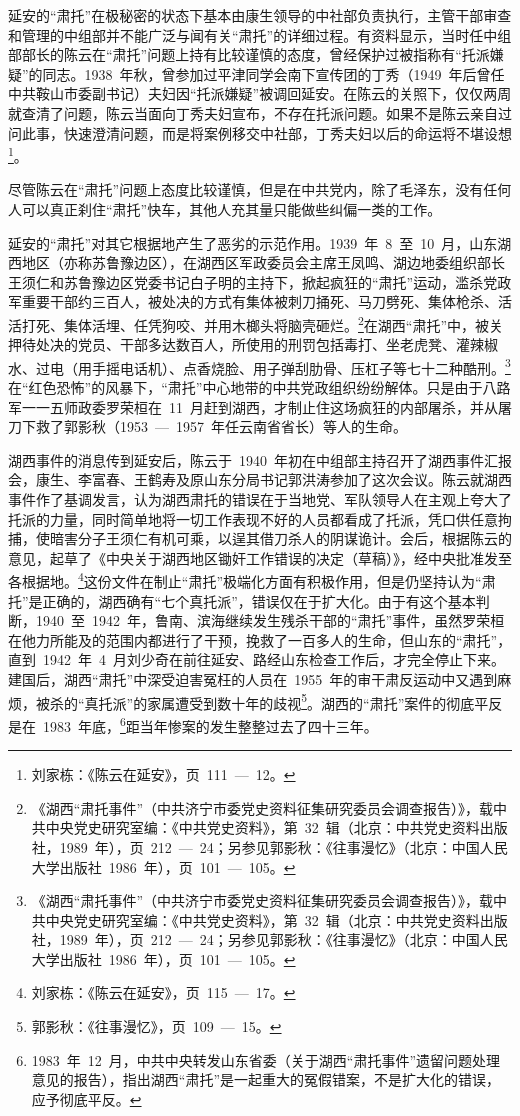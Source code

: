 延安的“肃托”在极秘密的状态下基本由康生领导的中社部负责执行，主管干部审查和管理的中组部并不能广泛与闻有关“肃托”的详细过程。有资料显示，当时任中组部部长的陈云在“肃托”问题上持有比较谨慎的态度，曾经保护过被指称有“托派嫌疑”的同志。1938~年秋，曾参加过平津同学会南下宣传团的丁秀（1949~年后曾任中共鞍山市委副书记）夫妇因“托派嫌疑”被调回延安。在陈云的关照下，仅仅两周就查清了问题，陈云当面向丁秀夫妇宣布，不存在托派问题。如果不是陈云亲自过问此事，快速澄清问题，而是将案例移交中社部，丁秀夫妇以后的命运将不堪设想\footnote{刘家栋：《陈云在延安》，页~111~—~12。}。

尽管陈云在“肃托”问题上态度比较谨慎，但是在中共党内，除了毛泽东，没有任何人可以真正刹住“肃托”快车，其他人充其量只能做些纠偏一类的工作。

延安的“肃托”对其它根据地产生了恶劣的示范作用。1939~年~8~至~10~月，山东湖西地区（亦称苏鲁豫边区），在湖西区军政委员会主席王凤鸣、湖边地委组织部长王须仁和苏鲁豫边区党委书记白子明的主持下，掀起疯狂的“肃托”运动，滥杀党政军重要干部约三百人，被处决的方式有集体被刺刀捅死、马刀劈死、集体枪杀、活活打死、集体活埋、任凭狗咬、并用木榔头将脑壳砸烂。\footnote{《湖西“肃托事件”（中共济宁市委党史资料征集研究委员会调查报告）》，载中共中央党史研究室编：《中共党史资料》，第~32~辑（北京：中共党史资料出版社，1989~年），页~212~—~24；另参见郭影秋：《往事漫忆》（北京：中国人民大学出版社~1986~年），页~101~—~105。}在湖西“肃托”中，被关押待处决的党员、干部多达数百人，所使用的刑罚包括毒打、坐老虎凳、灌辣椒水、过电（用手摇电话机）、点香烧脸、用子弹刮肋骨、压杠子等七十二种酷刑。\footnote{《湖西“肃托事件”（中共济宁市委党史资料征集研究委员会调查报告）》，载中共中央党史研究室编：《中共党史资料》，第~32~辑（北京：中共党史资料出版社，1989~年），页~212~—~24；另参见郭影秋：《往事漫忆》（北京：中国人民大学出版社~1986~年），页~101~—~105。}在“红色恐怖”的风暴下，“肃托”中心地带的中共党政组织纷纷解体。只是由于八路军一一五师政委罗荣桓在~11~月赶到湖西，才制止住这场疯狂的内部屠杀，并从屠刀下救了郭影秋（1953~—~1957~年任云南省省长）等人的生命。

湖西事件的消息传到延安后，陈云于~1940~年初在中组部主持召开了湖西事件汇报会，康生、李富春、王鹤寿及原山东分局书记郭洪涛参加了这次会议。陈云就湖西事件作了基调发言，认为湖西肃托的错误在于当地党、军队领导人在主观上夸大了托派的力量，同时简单地将一切工作表现不好的人员都看成了托派，凭口供任意拘捕，使暗害分子王须仁有机可乘，以逞其借刀杀人的阴谋诡计。会后，根据陈云的意见，起草了《中央关于湖西地区锄奸工作错误的决定（草稿）》，经中央批准发至各根据地。\footnote{刘家栋：《陈云在延安》，页~115~—~17。}这份文件在制止“肃托”极端化方面有积极作用，但是仍坚持认为“肃托”是正确的，湖西确有“七个真托派”，错误仅在于扩大化。由于有这个基本判断，1940~至~1942~年，鲁南、滨海继续发生残杀干部的“肃托”事件，虽然罗荣桓在他力所能及的范围内都进行了干预，挽救了一百多人的生命，但山东的“肃托”，直到~1942~年~4~月刘少奇在前往延安、路经山东检查工作后，才完全停止下来。建国后，湖西“肃托”中深受迫害冤枉的人员在~1955~年的审干肃反运动中又遇到麻烦，被杀的“真托派”的家属遭受到数十年的歧视\footnote{郭影秋：《往事漫忆》，页~109~—~15。}。湖西的“肃托”案件的彻底平反是在~1983~年底，\footnote{1983~年~12~月，中共中央转发山东省委（关于湖西“肃托事件”遗留问题处理意见的报告），指出湖西“肃托”是一起重大的冤假错案，不是扩大化的错误，应予彻底平反。}距当年惨案的发生整整过去了四十三年。

